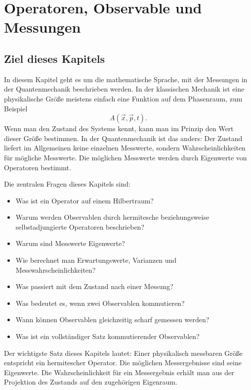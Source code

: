 \chapter{Operatoren, Observable und Messungen}

\section{Ziel dieses Kapitels}

In diesem Kapitel geht es um die mathematische Sprache, mit der Messungen in der Quantenmechanik beschrieben werden. In der klassischen Mechanik ist eine physikalische Größe meistens einfach eine Funktion auf dem Phasenraum, zum Beispiel
\[
    A(\vec x,\vec p,t).
\]
Wenn man den Zustand des Systems kennt, kann man im Prinzip den Wert dieser Größe bestimmen. In der Quantenmechanik ist das anders: Der Zustand liefert im Allgemeinen keine einzelnen Messwerte, sondern Wahrscheinlichkeiten für mögliche Messwerte. Die möglichen Messwerte werden durch Eigenwerte von Operatoren bestimmt.

Die zentralen Fragen dieses Kapitels sind:
\begin{itemize}
    \item Was ist ein Operator auf einem Hilbertraum?
    \item Warum werden Observablen durch hermitesche beziehungsweise selbstadjungierte Operatoren beschrieben?
    \item Warum sind Messwerte Eigenwerte?
    \item Wie berechnet man Erwartungswerte, Varianzen und Messwahrscheinlichkeiten?
    \item Was passiert mit dem Zustand nach einer Messung?
    \item Was bedeutet es, wenn zwei Observablen kommutieren?
    \item Wann können Observablen gleichzeitig scharf gemessen werden?
    \item Was ist ein vollständiger Satz kommutierender Observablen?
\end{itemize}

\begin{conceptbox}
Der wichtigste Satz dieses Kapitels lautet: Einer physikalisch messbaren Größe entspricht ein hermitescher Operator. Die möglichen Messergebnisse sind seine Eigenwerte. Die Wahrscheinlichkeit für ein Messergebnis erhält man aus der Projektion des Zustands auf den zugehörigen Eigenraum.
\end{conceptbox}

